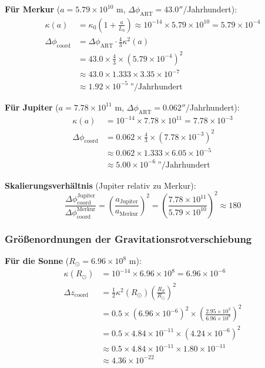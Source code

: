 \documentclass[11pt,a4paper]{article}
\begin{document}
	\textbf{Für Merkur} ($a = 5.79 \times 10^{10}$ m, $\Delta\phi_{\text{ART}} = 43.0''$/Jahrhundert):
	\begin{align}
		\kappa(a) &= \kappa_0 \left(1 + \frac{a}{L_0}\right) 
		\approx 10^{-14} \times 5.79 \times 10^{10} = 5.79 \times 10^{-4} \\
		\Delta\phi_{\text{coord}} &= \Delta\phi_{\text{ART}} \cdot \frac{4}{3} \kappa^2(a) \\
		&= 43.0 \times \frac{4}{3} \times (5.79 \times 10^{-4})^2 \\
		&\approx 43.0 \times 1.333 \times 3.35 \times 10^{-7} \\
		&\approx 1.92 \times 10^{-5} \ \text{''}/\text{Jahrhundert}
	\end{align}
	
	\textbf{Für Jupiter} ($a = 7.78 \times 10^{11}$ m, $\Delta\phi_{\text{ART}} = 0.062''$/Jahrhundert):
	\begin{align}
		\kappa(a) &= 10^{-14} \times 7.78 \times 10^{11} = 7.78 \times 10^{-3} \\
		\Delta\phi_{\text{coord}} &= 0.062 \times \frac{4}{3} \times (7.78 \times 10^{-3})^2 \\
		&\approx 0.062 \times 1.333 \times 6.05 \times 10^{-5} \\
		&\approx 5.00 \times 10^{-6}~\text{''}/\text{Jahrhundert}
	\end{align}
	
	\textbf{Skalierungsverhältnis} (Jupiter relativ zu Merkur):
	\begin{equation}
		\frac{\Delta\phi_{\text{coord}}^{\text{Jupiter}}}{\Delta\phi_{\text{coord}}^{\text{Merkur}}}
		= \left(\frac{a_{\text{Jupiter}}}{a_{\text{Merkur}}}\right)^2 
		= \left(\frac{7.78 \times 10^{11}}{5.79 \times 10^{10}}\right)^2 \approx 180
	\end{equation}
	
	\subsubsection{Größenordnungen der Gravitationsrotverschiebung}
	
	\textbf{Für die Sonne} ($R_\odot = 6.96 \times 10^8$ m):
	\begin{align}
		\kappa(R_\odot) &= 10^{-14} \times 6.96 \times 10^8 = 6.96 \times 10^{-6} \\
		\Delta z_{\text{coord}} &= \frac{1}{2} \kappa^2(R_\odot) \left(\frac{R_S}{R_\odot}\right)^2 \\
		&= 0.5 \times (6.96 \times 10^{-6})^2 \times \left(\frac{2.95 \times 10^3}{6.96 \times 10^8}\right)^2 \\
		&= 0.5 \times 4.84 \times 10^{-11} \times (4.24 \times 10^{-6})^2 \\
		&\approx 0.5 \times 4.84 \times 10^{-11} \times 1.80 \times 10^{-11} \\
		&\approx 4.36 \times 10^{-22}
	\end{align}
	
\end{document}
